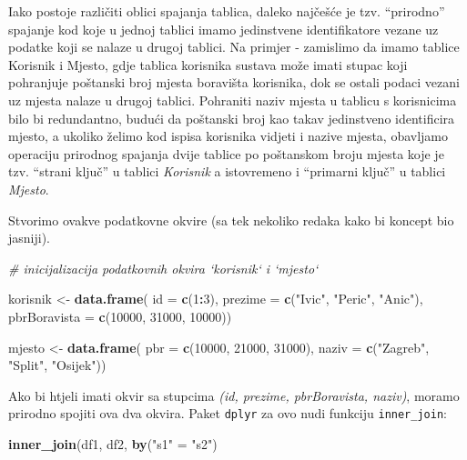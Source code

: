 \documentclass[]{book}
\newenvironment{Shaded}{\begin{snugshade}}{\end{snugshade}}
\newcommand{\KeywordTok}[1]{\textcolor[rgb]{0.13,0.29,0.53}{\textbf{#1}}}
\newcommand{\DataTypeTok}[1]{\textcolor[rgb]{0.13,0.29,0.53}{#1}}
\newcommand{\DecValTok}[1]{\textcolor[rgb]{0.00,0.00,0.81}{#1}}
\newcommand{\StringTok}[1]{\textcolor[rgb]{0.31,0.60,0.02}{#1}}
\newcommand{\CommentTok}[1]{\textcolor[rgb]{0.56,0.35,0.01}{\textit{#1}}}
\newcommand{\OperatorTok}[1]{\textcolor[rgb]{0.81,0.36,0.00}{\textbf{#1}}}
\newcommand{\NormalTok}[1]{#1}
\theoremstyle{definition}
\theoremstyle{definition}
\theoremstyle{definition}
\theoremstyle{remark}
\begin{document}
Iako postoje različiti oblici spajanja tablica, daleko najčešće je tzv.
``prirodno'' spajanje kod koje u jednoj tablici imamo jedinstvene
identifikatore vezane uz podatke koji se nalaze u drugoj tablici. Na
primjer - zamislimo da imamo tablice Korisnik i Mjesto, gdje tablica
korisnika sustava može imati stupac koji pohranjuje poštanski broj
mjesta boravišta korisnika, dok se ostali podaci vezani uz mjesta nalaze
u drugoj tablici. Pohraniti naziv mjesta u tablicu s korisnicima bilo bi
redundantno, budući da poštanski broj kao takav jedinstveno identificira
mjesto, a ukoliko želimo kod ispisa korisnika vidjeti i nazive mjesta,
obavljamo operaciju prirodnog spajanja dvije tablice po poštanskom broju
mjesta koje je tzv. ``strani ključ'' u tablici \emph{Korisnik} a
istovremeno i ``primarni ključ'' u tablici \emph{Mjesto}.

Stvorimo ovakve podatkovne okvire (sa tek nekoliko redaka kako bi
koncept bio jasniji).

\begin{Shaded}
\begin{Highlighting}[]
\CommentTok{# inicijalizacija podatkovnih okvira `korisnik` i `mjesto`}

\NormalTok{korisnik <-}\StringTok{ }\KeywordTok{data.frame}\NormalTok{( }\DataTypeTok{id =} \KeywordTok{c}\NormalTok{(}\DecValTok{1}\OperatorTok{:}\DecValTok{3}\NormalTok{), }\DataTypeTok{prezime =} \KeywordTok{c}\NormalTok{(}\StringTok{"Ivic"}\NormalTok{, }\StringTok{"Peric"}\NormalTok{, }\StringTok{"Anic"}\NormalTok{),}
                        \DataTypeTok{pbrBoravista =} \KeywordTok{c}\NormalTok{(}\DecValTok{10000}\NormalTok{, }\DecValTok{31000}\NormalTok{, }\DecValTok{10000}\NormalTok{))}

\NormalTok{mjesto <-}\StringTok{ }\KeywordTok{data.frame}\NormalTok{( }\DataTypeTok{pbr =} \KeywordTok{c}\NormalTok{(}\DecValTok{10000}\NormalTok{, }\DecValTok{21000}\NormalTok{, }\DecValTok{31000}\NormalTok{), }
                      \DataTypeTok{naziv =} \KeywordTok{c}\NormalTok{(}\StringTok{"Zagreb"}\NormalTok{, }\StringTok{"Split"}\NormalTok{, }\StringTok{"Osijek"}\NormalTok{))}
\end{Highlighting}
\end{Shaded}

Ako bi htjeli imati okvir sa stupcima \emph{(id, prezime, pbrBoravista,
naziv)}, moramo prirodno spojiti ova dva okvira. Paket \texttt{dplyr} za
ovo nudi funkciju \texttt{inner\_join}:

\begin{Shaded}
\begin{Highlighting}[]
\KeywordTok{inner_join}\NormalTok{(df1, df2, }\KeywordTok{by}\NormalTok{(}\StringTok{"s1"}\NormalTok{ =}\StringTok{ "s2"}\NormalTok{)}
\end{Highlighting}
\end{Shaded}
\end{document}
